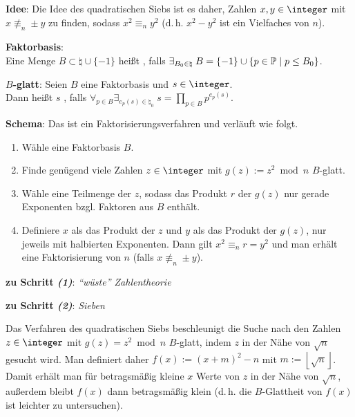 \textbf{Idee}:
Die Idee des quadratischen Siebs ist es daher, Zahlen $x, y \in \integer$ mit
$x \not\equiv_n \pm y$ zu finden, sodass $x^2 \equiv_n y^2$
(d.\,h. $x^2 - y^2$ ist ein Vielfaches von $n$).

\textbf{Faktorbasis}:\\
Eine Menge $B \subset \natural \cup \{-1\}$ heißt , falls
$\exists_{B_0 \in \natural}\; B = \{-1\} \cup \{p \in \mathbb{P} \;|\; p \le B_0\}$.

\textbf{$B$-glatt}:
Seien $B$ eine Faktorbasis und $s \in \integer$.\\
Dann heißt $s$ , falls $\forall_{p \in B} \exists_{e_p(s) \in \natural_0}\;
s = \prod_{p \in B} p^{e_p(s)}$.

\textbf{Schema}:
Das  ist ein Faktorisierungsverfahren und verläuft wie folgt.
\begin{enumerate}
    \item
    Wähle eine Faktorbasis $B$.

    \item
    Finde genügend viele Zahlen $z \in \integer$ mit $g(z) := z^2 \bmod n$ $B$-glatt.

    \item
    Wähle eine Teilmenge der $z$, sodass das Produkt $r$ der $g(z)$ nur gerade Exponenten bzgl.
    Faktoren aus $B$ enthält.

    \item
    Definiere $x$ als das Produkt der $z$ und
    $y$ als das Produkt der $g(z)$, nur jeweils mit halbierten Exponenten.
    Dann gilt $x^2 \equiv_n r = y^2$ und man erhält eine Faktorisierung von $n$
    (falls $x \not\equiv_n \pm y$).
\end{enumerate}

\linie

\textbf{zu Schritt \emph{(1)}}:
\emph{"`wüste"' Zahlentheorie}

\linie

\textbf{zu Schritt \emph{(2)}}:
\emph{Sieben}

Das Verfahren des quadratischen Siebs beschleunigt die Suche nach den Zahlen $z \in \integer$ mit
$g(z) = z^2 \bmod n$ $B$-glatt, indem $z$ in der Nähe von $\sqrt{n}$ gesucht wird.
Man definiert daher $f(x) := (x + m)^2 - n$ mit $m := \left\lfloor\sqrt{n}\right\rfloor$.
Damit erhält man für betragsmäßig kleine $x$ Werte von $z$ in der Nähe von $\sqrt{n}$,
außerdem bleibt $f(x)$ dann betragsmäßig klein
(d.\,h. die $B$-Glattheit von $f(x)$ ist leichter zu untersuchen).

